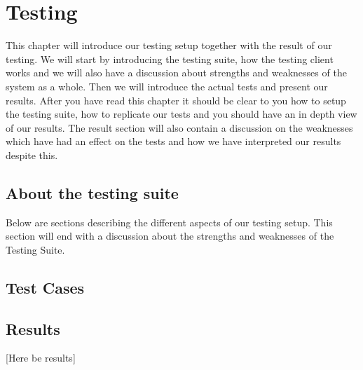 \section{Testing}\label{Testing}
	This chapter will introduce our testing setup together with the result of our testing. We will start by introducing the testing suite, how the testing client works and we will also have a discussion about strengths and weaknesses of the system as a whole. Then we will introduce the actual tests and present our results. After you have read this chapter it should be clear to you how to setup the testing suite, how to replicate our tests and you should have an in depth view of our results. The result section will also contain a discussion on the weaknesses which have had an effect on the tests and how we have interpreted our results despite this.
	    
    \subsection{About the testing suite}\label{Testing:About}
    	Below are sections describing the different aspects of our testing setup. This section will end with a discussion about the strengths and weaknesses of the Testing Suite.
    	
 		
    	
    	
	\subsection{Test Cases}\label{Testing:Cases}
		
	\subsection{Results}\label{Testing:Results}
		[Here be results]
